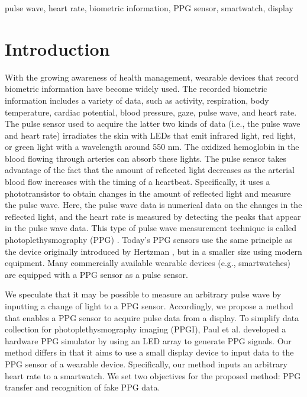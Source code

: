\documentclass{ieeeaccess}
\begin{document}
\begin{keywords}
pulse wave, heart rate, biometric information, PPG sensor, smartwatch, display
\end{keywords}

\titlepgskip=-15pt

\maketitle

\section{Introduction}
\label{sec:introduction}
With the growing awareness of health management, wearable devices that record biometric information have become widely used. The recorded biometric information includes a variety of data, such as activity, respiration, body temperature, cardiac potential, blood pressure, gaze, pulse wave, and heart rate. The pulse sensor used to acquire the latter two kinds of data (i.e., the pulse wave and heart rate) irradiates the skin with LEDs that emit infrared light, red light, or green light with a wavelength around 550 nm. The oxidized hemoglobin in the blood flowing through arteries can absorb these lights. The pulse sensor takes advantage of the fact that the amount of reflected light decreases as the arterial blood flow increases with the timing of a heartbeat. Specifically, it uses a phototransistor to obtain changes in the amount of reflected light and measure the pulse wave. Here, the pulse wave data is numerical data on the changes in the reflected light, and the heart rate is measured by detecting the peaks that appear in the pulse wave data. This type of pulse wave measurement technique is called photoplethysmography (PPG) \cite{ppg}. Today's PPG sensors use the same principle as the device originally introduced by Hertzman \cite{ppg_principle1, ppg_principle2}, but in a smaller size using modern equipment. Many commercially available wearable devices (e.g., smartwatches) are equipped with a PPG sensor as a pulse sensor.\par

We speculate that it may be possible to measure an arbitrary pulse wave by inputting a change of light to a PPG sensor. Accordingly, we propose a method that enables a PPG sensor to acquire pulse data from a display. To simplify data collection for photoplethysmography imaging (PPGI), Paul et al. \cite{ppg_generator} developed a hardware PPG simulator by using an LED array to generate PPG signals. Our method differs in that it aims to use a small display device to input data to the PPG sensor of a wearable device. Specifically, our method inputs an arbitrary heart rate to a smartwatch. We set two objectives for the proposed method: PPG transfer and recognition of fake PPG data.\par
\end{document}
